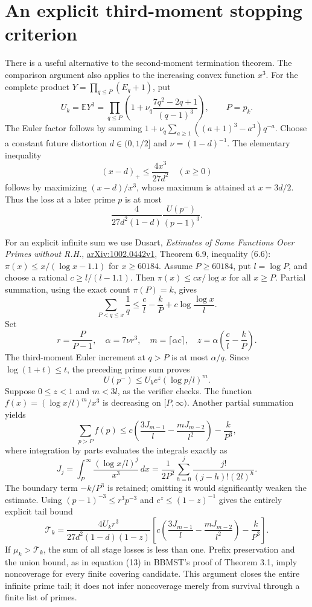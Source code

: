 \documentclass[11pt]{article}
\newcommand{\E}{\mathbb E}
\begin{document}
\section{An explicit third-moment stopping criterion}\label{sec:thirdtail}
There is a useful alternative to the second-moment termination theorem.
The comparison argument also applies to the increasing convex function
$x^3$. For the complete product $Y=\prod_{q\leq P}(E_q+1)$, put
\[
 U_k=\E Y^3=\prod_{q\leq P}
 \left(1+\nu_q\frac{7q^2-2q+1}{(q-1)^3}\right),\qquad P=p_k.
\]
The Euler factor follows by summing
$1+\nu_q\sum_{a\geq1}((a+1)^3-a^3)q^{-a}$.
Choose a constant future distortion $d\in(0,1/2]$ and
$\nu=(1-d)^{-1}$. The elementary inequality
\[
 (x-d)_+\leq\frac{4x^3}{27d^2}\quad(x\geq0)
\]
follows by maximizing $(x-d)/x^3$, whose maximum is attained at
$x=3d/2$. Thus the loss at a later prime $p$ is at most
\[
 \frac{4}{27d^2(1-d)}\frac{U(p^-)}{(p-1)^3}.
\]

For an explicit infinite sum we use Dusart,
\emph{Estimates of Some Functions Over Primes without R.H.},
\href{https://arxiv.org/pdf/1002.0442}{arXiv:1002.0442v1},
Theorem 6.9, inequality (6.6):
$\pi(x)\leq x/(\log x-1.1)$ for $x\geq60184$.
Assume $P\geq60184$, put $l=\log P$, and choose a rational
$c\geq l/(l-1.1)$. Then $\pi(x)\leq cx/\log x$ for all $x\geq P$.
Partial summation, using the exact count $\pi(P)=k$, gives
\[
 \sum_{P<q\leq x}\frac1q
 \leq \frac{c}{l}-\frac{k}{P}
       +c\log\frac{\log x}{l}.
\]
Set
\[
 r=\frac{P}{P-1},\quad \alpha=7\nu r^3,\quad
 m=\lceil\alpha c\rceil,\quad
 z=\alpha\left(\frac{c}{l}-\frac{k}{P}\right).
\]
The third-moment Euler increment at $q>P$ is at most $\alpha/q$.
Since $\log(1+t)\leq t$, the preceding prime sum proves
\[
 U(p^-)\leq U_k e^z(\log p/l)^m.
\]
Suppose $0\leq z<1$ and $m<3l$, as the verifier checks. The function
$f(x)=(\log x/l)^m/x^3$ is decreasing on $[P,\infty)$.
Another partial summation yields
\[
 \sum_{p>P}f(p)
 \leq c\left(\frac{3J_{m-1}}{l}
             -\frac{mJ_{m-2}}{l^2}\right)-\frac{k}{P^3},
\]
where integration by parts evaluates the integrals exactly as
\[
 J_j=\int_P^\infty\frac{(\log x/l)^j}{x^3}\,dx
 =\frac1{2P^2}\sum_{h=0}^j\frac{j!}{(j-h)!(2l)^h}.
\]
The boundary term $-k/P^3$ is retained; omitting it would significantly
weaken the estimate. Using $(p-1)^{-3}\leq r^3p^{-3}$ and
$e^z\leq(1-z)^{-1}$ gives the entirely explicit tail bound
\begin{equation}\label{eq:thirdtail}
 \mathcal T_k=
 \frac{4U_kr^3}{27d^2(1-d)(1-z)}
 \left[c\left(\frac{3J_{m-1}}l-
                   \frac{mJ_{m-2}}{l^2}\right)-\frac{k}{P^3}\right].
\end{equation}
If $\mu_k>\mathcal T_k$, the sum of all stage losses is less than one.
Prefix preservation and the union bound, as in equation (13) in BBMST's
proof of Theorem 3.1, imply noncoverage for every finite covering candidate.
This argument closes the entire infinite prime tail; it does not infer
noncoverage merely from survival through a finite list of primes.
\end{document}
